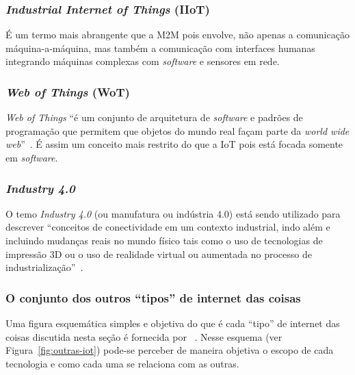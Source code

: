 \documentclass[pdftex, brazil, 12pt, twoside]{article}
\newcommand{\ingles}[1]{\textit{#1}}
\begin{document}
\subsubsection{\ingles{Industrial Internet of Things} (IIoT)}
\label{o-que-e-iot-outros-tipos-iiot}

É um termo mais abrangente que a M2M pois envolve, não apenas a comunicação
máquina-a-máquina, mas também a comunicação com interfaces humanas~\citep{LuethIoT2014}
integrando máquinas complexas com \ingles{software} e sensores em rede.


\subsubsection{\ingles{Web of Things} (WoT)}
\label{o-que-e-iot-outros-tipos-wot}

\ingles{Web of Things} ``é um conjunto de
arquitetura de \ingles{software} e padrões de programação que permitem que
objetos do mundo real façam parte da \ingles{world wide web}''~\citep{LuethIoT2014}.
É assim um conceito mais restrito do que a IoT pois está focada
somente em \ingles{software}.


\subsubsection{\ingles{Industry 4.0}}
\label{o-que-e-iot-outros-tipos-industry-4.0}

O temo \ingles{Industry 4.0} (ou manufatura ou indústria 4.0) está sendo
utilizado para descrever ``conceitos de conectividade em um contexto industrial,
indo além e incluindo mudanças reais
no mundo físico tais como o uso de tecnologias de impressão 3D ou o uso de realidade
virtual ou aumentada no processo de industrialização''~\citep{LuethIoT2014}.


\subsubsection{O conjunto dos outros ``tipos'' de internet das coisas}
\label{o-que-e-iot-outros-tipos-conjunto}

Uma figura esquemática simples e objetiva do que é cada ``tipo'' de internet das coisas
discutida nesta seção é fornecida por ~\citet{LuethIoT2014}. Nesse esquema
(ver Figura~\ref{fig:outras-iot}) pode-se
perceber de maneira objetiva o escopo de cada tecnologia e como cada uma se relaciona
com as outras.
\end{document}
